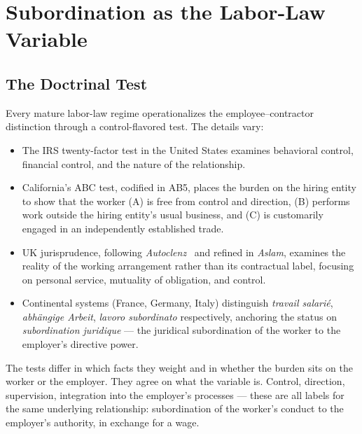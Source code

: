 \documentclass[11pt,a4paper]{article}
\theoremstyle{remark}
\begin{document}
\section{Subordination as the Labor-Law Variable}
\label{sec:subordination}

\subsection{The Doctrinal Test}

Every mature labor-law regime operationalizes the
employee--contractor distinction through a control-flavored test.
The details vary:

\begin{itemize}
  \item The IRS twenty-factor test in the United States examines
    behavioral control, financial control, and the nature of the
    relationship.
  \item California's ABC test, codified in AB5, places the burden
    on the hiring entity to show that the worker
    (A) is free from control and direction,
    (B) performs work outside the hiring entity's usual business,
    and (C) is customarily engaged in an independently established
    trade.
  \item UK jurisprudence, following \emph{Autoclenz}~\citep{autoclenz_2011}
    and refined in \emph{Aslam}, examines the reality of the
    working arrangement rather than its contractual label,
    focusing on personal service, mutuality of obligation, and
    control.
  \item Continental systems (France, Germany, Italy) distinguish
    \emph{travail salarié}, \emph{abh\"angige Arbeit},
    \emph{lavoro subordinato} respectively, anchoring the status
    on \emph{subordination juridique} --- the juridical subordination
    of the worker to the employer's directive power.
\end{itemize}

The tests differ in which facts they weight and in whether the
burden sits on the worker or the employer. They agree on what the
variable is. Control, direction, supervision, integration into the
employer's processes --- these are all labels for the same underlying
relationship: subordination of the worker's conduct to the employer's
authority, in exchange for a wage.
\end{document}
